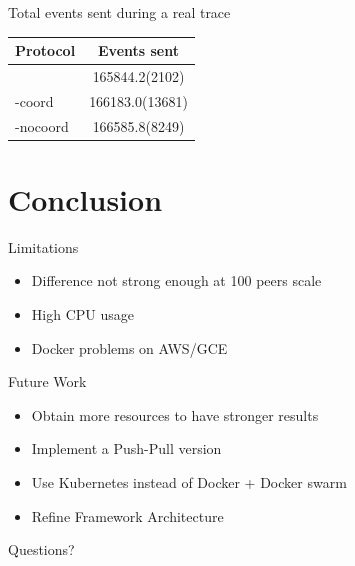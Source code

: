 \begin{frame}{Total events sent during a real trace}
	\begin{table}
		\centering
		\begin{tabular}{lS}
			\toprule
			Protocol & {Events sent}\\
			\midrule
			\epto & 165844.2(2102)\\
			\jgroups-coord & 166183.0(13681)\\
			\jgroups-nocoord & 166585.8(8249)\\
			\bottomrule
		\end{tabular}
	\end{table}
\end{frame}

\section{Conclusion}
\subtitle[Conclusion]{Conclusion}

\begin{frame}{Limitations}
	\begin{itemize}
		\item Difference not strong enough at 100 peers scale
		\item High CPU usage
		\item Docker problems on AWS/GCE
	\end{itemize}
\end{frame}

\begin{frame}{Future Work}
    \begin{itemize}
        \item Obtain more resources to have stronger results
        \item Implement a Push-Pull \epto{} version
        \item Use Kubernetes instead of Docker + Docker swarm
        \item Refine Framework Architecture
    \end{itemize}
\end{frame}

\begin{frame}[standout]
	Questions?
\end{frame}

\appendix

